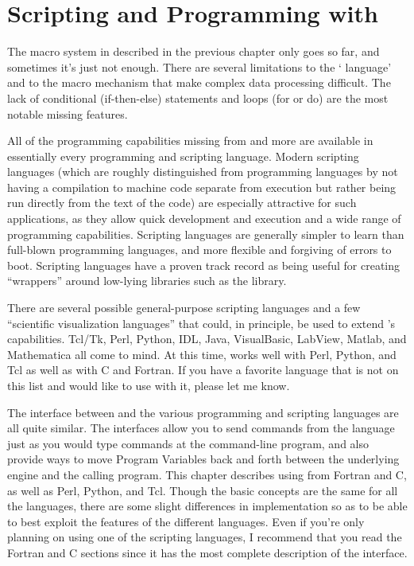 \section{Scripting and Programming with  {\ifeffit}} \label{Ch:Scripting}

The macro system in {\ifeffit} described in the previous chapter only goes
so far, and sometimes it's just not enough.  There are several limitations
to the `{\ifeffit} language' and to the macro mechanism that make complex
data processing difficult.  The lack of conditional (if-then-else)
statements and loops (for or do) are the most notable missing features.

All of the programming capabilities missing from {\ifeffit} and more are
available in essentially every programming and scripting language.  Modern
scripting languages (which are roughly distinguished from programming
languages by not having a compilation to machine code separate from
execution but rather being run directly from the text of the code) are
especially attractive for such applications, as they allow quick
development and execution and a wide range of programming capabilities.
Scripting languages are generally simpler to learn than full-blown
programming languages, and more flexible and forgiving of errors to boot.
Scripting languages have a proven track record as being useful for creating
``wrappers'' around low-lying libraries such as the {\ifeffit} library.

There are several possible general-purpose scripting languages and a few
``scientific visualization languages'' that could, in principle, be used to
extend {\ifeffit}'s capabilities.  Tcl/Tk, Perl, Python, IDL, Java,
VisualBasic, LabView, Matlab, and Mathematica all come to mind.  At this
time, {\ifeffit} works well with Perl, Python, and Tcl as well as with C
and Fortran.  If you have a favorite language that is not on this list and
would like to use {\ifeffit} with it, please let me know.

The interface between {\ifeffit} and the various programming and scripting
languages are all quite similar.  The interfaces allow you to send commands
from the language just as you would type commands at the command-line
program, and also provide ways to move Program Variables back and forth
between the underlying engine and the calling program.  This chapter
describes using {\ifeffit} from Fortran and C, as well as Perl, Python, and
Tcl.  Though the basic concepts are the same for all the languages, there
are some slight differences in implementation so as to be able to best
exploit the features of the different languages.  Even if you're only
planning on using one of the scripting languages, I recommend that you read
the Fortran and C sections since it has the most complete description of
the interface.

